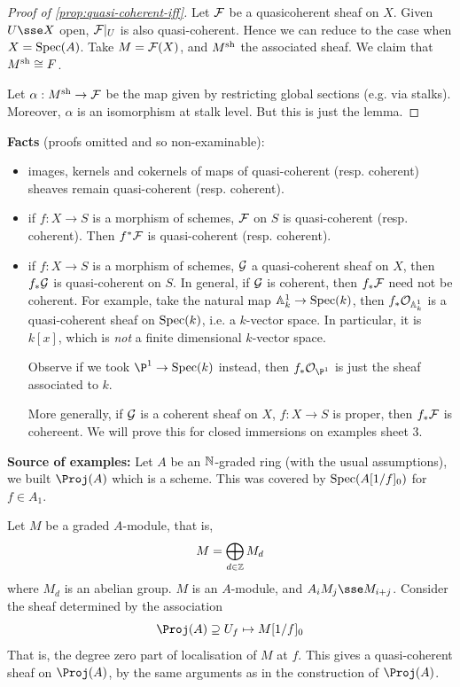 \documentclass{article}
\begin{document}
\begin{proof}
    [Proof of \cref{prop:quasi-coherent-iff}] Let \(\mathcal{F}\) be a quasicoherent sheaf on \(X\). Given \(U \sse X\) open, \(\mathcal{F}\vert_U\) is also quasi-coherent. Hence we can reduce to the case when \(X = \operatorname{Spec}(A)\). Take \(M = \mathcal{F}(X)\), and \(M^{\operatorname{sh}}\) the associated sheaf. We claim that \(M^{\operatorname{sh}} \cong F\).

    Let \(\alpha : M^{\operatorname{sh}} \to \mathcal{F}\) be the map given by restricting global sections (e.g. via stalks). Moreover, \(\alpha\) is an isomorphism at stalk level. But this is just the lemma.
\end{proof}

\lec

\textbf{Facts} (proofs omitted and so non-examinable):
\begin{itemize}
    \item images, kernels and cokernels of maps of quasi-coherent (resp. coherent) sheaves remain quasi-coherent (resp. coherent).
    \item if \(f : X \to S\) is a morphism of schemes, \(\mathcal{F}\) on \(S\) is quasi-coherent (resp. coherent). Then \(f^*\mathcal{F}\) is quasi-coherent (resp. coherent).
    \item if \(f : X \to S\) is a morphism of schemes, \(\mathcal{G}\) a quasi-coherent sheaf on \(X\), then \(f_*\mathcal{G}\) is quasi-coherent on \(S\). In general, if \(\mathcal{G}\) is coherent, then \(f_*\mathcal{F}\) need not be coherent. For example, take the natural map \(\mathbb{A}_{k}^{1} \to \operatorname{Spec}(k)\), then \(f_*\mathcal{O}_{\mathbb{A}_{k}^{1}}\) is a quasi-coherent sheaf on \(\operatorname{Spec}(k)\), i.e. a \(k\)-vector space. In particular, it is \(k[x]\), which is \emph{not} a finite dimensional \(k\)-vector space.
    
    Observe if we took \(\P^1 \to \Spec(k)\) instead, then \(f_*\mcO_{\P^1}\) is just the sheaf associated to \(k\).

    More generally, if \(\mathcal{G}\) is a coherent sheaf on \(X\), \(f : X \to S\) is proper, then \(f_*\mathcal{F}\) is cohereent. We will prove this for closed immersions on examples sheet 3.
\end{itemize}

\textbf{Source of examples:} Let \(A\) be an \(\mathbb{N}\)-graded ring (with the usual assumptions), we built \(\Proj(A)\) which is a scheme. This was covered by \(\operatorname{Spec}(A[1/f]_0)\) for \(f \in A_1\).

\begin{definition}
    Let \(M\) be a graded \(A\)-module, that is,
    \[M = \bigoplus_{d \in \mathbb{Z}}M_d\]
    where \(M_d\) is an abelian group. \(M\) is an \(A\)-module, and \(A_i M_j \sse M_{i+j}\). Consider the sheaf determined by the association
    \[\Proj(A) \supseteq U_f \mapsto M[1/f]_0\]
    That is, the degree zero part of localisation of \(M\) at \(f\). This gives a quasi-coherent sheaf on \(\Proj(A)\), by the same arguments as in the construction of \(\Proj(A)\).
\end{definition}
\end{document}
